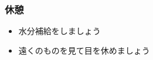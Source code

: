 \documentclass[dvipdfmx]{beamer}
\begin{document}
\begin{frame}[fragile]
	\frametitle{休憩~~~}

	\huge
      \begin{itemize}
           \item 水分補給をしましょう
           \item 遠くのものを見て目を休めましょう
     \end{itemize}



\end{frame}
\end{document}
